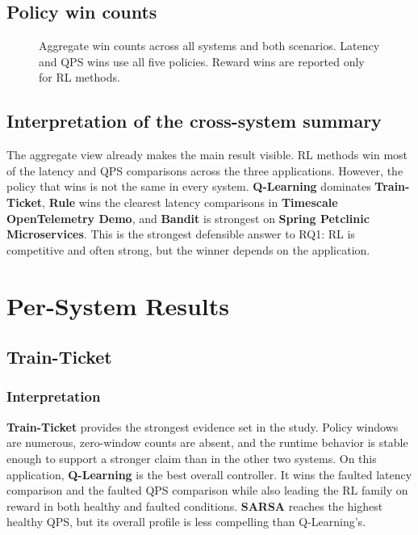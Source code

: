 \documentclass[11pt]{report}
\newcommand{\QL}{\textbf{Q-Learning}}
\newcommand{\SARSA}{\textbf{SARSA}}
\newcommand{\Bandit}{\textbf{Bandit}}
\newcommand{\Rule}{\textbf{Rule}}
\newcommand{\TT}{\textbf{Train-Ticket}}
\newcommand{\TS}{\textbf{Timescale OpenTelemetry Demo}}
\newcommand{\SP}{\textbf{Spring Petclinic Microservices}}
\begin{document}
\section{Policy win counts}
\begin{figure}[H]
\centering
{}
\caption{Aggregate win counts across all systems and both scenarios. Latency and QPS wins use all five policies. Reward wins are reported only for RL methods.}
\end{figure}

\section{Interpretation of the cross-system summary}
The aggregate view already makes the main result visible. RL methods win most of the latency and QPS comparisons across the three applications. However, the policy that wins is not the same in every system. \QL{} dominates \TT{}, \Rule{} wins the clearest latency comparisons in \TS{}, and \Bandit{} is strongest on \SP{}. This is the strongest defensible answer to RQ1: RL is competitive and often strong, but the winner depends on the application.

\chapter{Per-System Results}
\section{Train-Ticket}
\subsection{Interpretation}
\TT{} provides the strongest evidence set in the study. Policy windows are numerous, zero-window counts are absent, and the runtime behavior is stable enough to support a stronger claim than in the other two systems. On this application, \QL{} is the best overall controller. It wins the faulted latency comparison and the faulted QPS comparison while also leading the RL family on reward in both healthy and faulted conditions. \SARSA{} reaches the highest healthy QPS, but its overall profile is less compelling than Q-Learning's.
\end{document}

